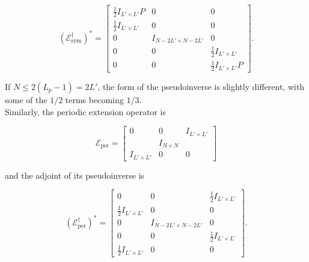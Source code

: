 \documentclass[journal]{IEEEtran}
\begin{document}
\[ \left(\mathcal{E}_\text{sym}^\dagger\right)^\ast = \begin{bmatrix}\frac{1}{2}I_{L'\times L'}P & 0 & 0\\\frac{1}{2}I_{L'\times L'} & 0 & 0\\0 & I_{N-2L'\times N-2L'} & 0\\0&0&\frac{1}{2}I_{L'\times L'}\\0&0&\frac{1}{2}I_{L'\times L'}P\end{bmatrix}. \]

\noindent If ${N \le 2(L_p-1)=2L'}$, the form of the pseudoinverse is slightly different, with some of the $1/2$ terms becoming $1/3$.\\%

Similarly, the periodic extension operator is

\[ \mathcal{E}_\text{per} = \begin{bmatrix} 0 & 0 & I_{L'\times L'}\\&I_{N\times N}&\\I_{L'\times L'}&0&0\end{bmatrix} \] 

\noindent and the adjoint of its pseudoinverse is

\[ \left(\mathcal{E}_\text{per}^\dagger\right)^\ast = \begin{bmatrix} 0 & 0 & \frac{1}{2}I_{L'\times L'}\\\frac{1}{2}I_{L'\times L'}&0&0\\0&I_{N-2L'\times N-2L'}&0\\0&0&\frac{1}{2}I_{L'\times L'}\\\frac{1}{2}I_{L'\times L'}&0&0\end{bmatrix}. \] 
\end{document}
